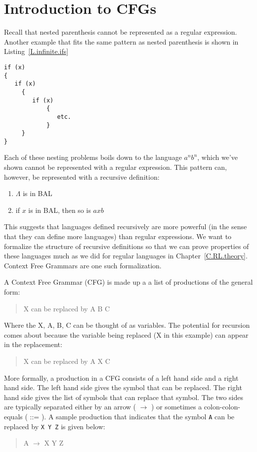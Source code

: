 \documentclass[letterpaper,12pt,openany,reqno]{book}%
\newcommand{\code}[1] {\lstinline[breaklines=yes,breakatwhitespace=yes]{#1}}
\newcommand{\cfgindentprod}[2] {\begin{quote} {\ttfamily #1} $\rightarrow$ {\ttfamily #2} \end{quote}}
\begin{document}
\section{Introduction to CFGs}
Recall that nested parenthesis cannot be represented as a regular expression. Another example that fits the same pattern as nested parenthesis is shown in Listing~\ref{L.infinite.ifs}
\begin{lstlisting}[caption={Nested if statements},label=L.infinite.ifs]
if (x)
{
   if (x)
	 {
	    if (x)
			{
			   etc.
			}
	 }
}
\end{lstlisting}
Each of these nesting problems boils down to the language $a^nb^n$, which we've shown cannot be represented with a regular expression. This pattern can, however, be represented with a recursive definition:
\begin{enumerate}
\item $\Lambda$ is in BAL
\item if $x$ is in BAL, then so is $axb$
\end{enumerate}

This suggests that languages defined recursively are more powerful (in the sense that they can define more languages) than regular expressions. We want to formalize the structure of recursive definitions so that we can prove properties of these languages much as we did for regular languages in Chapter~\ref{C.RL.theory}. Context Free Grammars are one such formalization.

A Context Free Grammar (CFG) is made up a a list of productions of the general form:
\begin{quote}
X can be replaced by A B C
\end{quote}
Where the X, A, B, C can be thought of as variables. The potential for recursion comes about because the variable being replaced (X in this example) can appear in the replacement:
\begin{quote}
X can be replaced by A X C
\end{quote}

More formally, a production in a CFG consists of a left hand side and a right hand side. The left hand side gives the symbol that can be replaced. The right hand side gives the list of symbols that can replace that symbol. The two sides are typically separated 
either by an arrow ( $\rightarrow$ ) 
or sometimes a colon-colon-equals ( ::= ). 
A sample production that indicates that the symbol \code{A} 
can be replaced by \code{X Y Z} is given below:

\cfgindentprod{A}{X Y Z}
\end{document}
